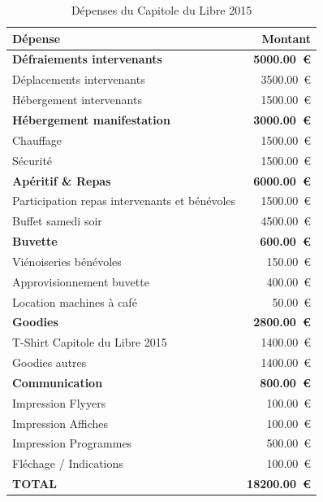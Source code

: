 \begin{table}[!h]
\begin{center}
	\caption{Dépenses du Capitole du Libre 2015}\label{tab_dépenses}
    \begin{tabular}{|l|r|}
        \hline \textbf{Dépense} & \textbf{Montant} \\
        \hline \textbf{Défraiements intervenants} & \textbf{\SI{5000.00}{\euro}} \\
        \hline Déplacements intervenants & \SI{3500.00}{\euro} \\
        \hline Hébergement intervenants & \SI{1500.00}{\euro} \\
        \hline \textbf{Hébergement manifestation} & \textbf{\SI{3000.00}{\euro}}\\
        \hline Chauffage & \SI{1500.00}{\euro} \\
        \hline Sécurité & \SI{1500.00}{\euro} \\
        \hline \textbf{Apéritif \& Repas} & \textbf{\SI{6000.00}{\euro}}\\
        \hline Participation repas intervenants et bénévoles & \SI{1500.00}{\euro} \\
        \hline Buffet samedi soir & \SI{4500.00}{\euro} \\
        \hline \textbf{Buvette} & \textbf{\SI{600.00}{\euro}}\\
        \hline Viénoiseries bénévoles & \SI{150.00}{\euro} \\
        \hline Approvisionnement buvette & \SI{400.00}{\euro} \\
        \hline Location machines à café & \SI{50.00}{\euro} \\
        \hline \textbf{Goodies} & \textbf{\SI{2800.00}{\euro} }\\
        \hline T-Shirt Capitole du Libre 2015 & \SI{1400.00}{\euro} \\
        \hline Goodies autres & \SI{1400.00}{\euro} \\
        \hline \textbf{Communication} & \textbf{\SI{800.00}{\euro}} \\
        \hline Impression Flyyers & \SI{100.00}{\euro} \\
        \hline Impression Affiches & \SI{100.00}{\euro} \\
        \hline Impression Programmes & \SI{500.00}{\euro} \\
        \hline Fléchage / Indications & \SI{100.00}{\euro} \\
        \hline
        \hline \textbf{TOTAL} & \textbf{\SI{18200.00}{\euro}} \\
        \hline
    \end{tabular}
\end{center}
\end{table}

